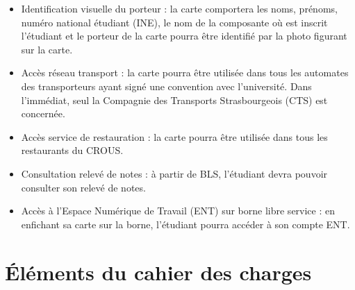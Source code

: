 \documentclass[12pt]{article}
\begin{document}
\begin{itemize}
\item  Identification visuelle du porteur : la carte comportera les noms, prénoms, 
numéro national étudiant (INE), le nom de la composante où est inscrit l'étudiant
et le porteur de la carte pourra être identifié par la  photo figurant sur la carte.\\

\item  Accès réseau transport : la carte pourra être utilisée dans tous les automates
des transporteurs ayant signé une convention avec l'université. Dans l'immédiat, seul
la Compagnie des Transports Strasbourgeois (CTS) est concernée.\\

\item  Accès service de restauration : la carte pourra être utilisée dans tous les 
restaurants du CROUS.\\

\item  Consultation relevé de notes :  à partir de BLS, l'étudiant devra pouvoir consulter
	son relevé de notes.\\

\item  Accès à l'Espace Numérique de Travail (ENT) sur borne libre service :  
      en enfichant sa carte sur la borne, l'étudiant pourra accéder à son compte ENT.

\end{itemize}


\section{\'Eléments du cahier des charges}
\end{document}
